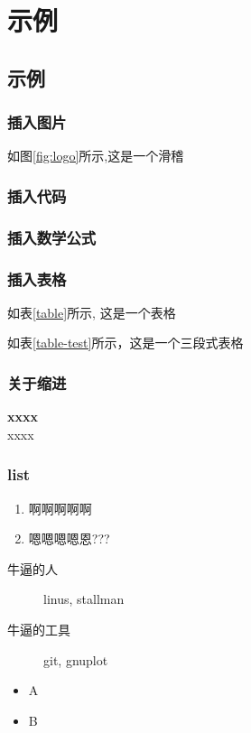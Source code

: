 
\chapter{示例}
\section{示例}

\subsection{插入图片}
如图\ref{fig:logo}所示,这是一个滑稽\\

\subsection{插入代码}

\subsection{插入数学公式}


\subsection{插入表格}
如表\ref{table}所示, 这是一个表格

如表\ref{table-test}所示，这是一个三段式表格

\subsection{关于缩进}
\indent \textbf{xxxx}\\
\noindent xxxx

\subsection{list}
\begin{enumerate}
	\item  啊啊啊啊啊
	\item  嗯嗯嗯嗯恩???
\end{enumerate}
\begin{description}
  \item[牛逼的人] linus, stallman 
  \item[牛逼的工具] git, gnuplot
\end{description}
\begin{itemize}
	\item A
	\item B
\end{itemize}
